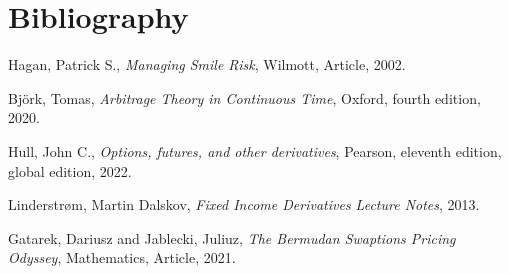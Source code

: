 \clearpage
{}
\section*{Bibliography}
\renewcommand{\refname}{} 

\begin{thebibliography}{25}
Hagan, Patrick S., \emph{Managing Smile Risk},
Wilmott, Article, 2002.

Björk, Tomas, \emph{Arbitrage Theory in Continuous Time},
Oxford, fourth edition, 2020.

Hull, John C., \emph{Options, futures, and other derivatives},
Pearson, eleventh edition, global edition, 2022.

Linderstrøm, Martin Dalskov, \emph{Fixed Income Derivatives Lecture Notes},
2013.



Gatarek, Dariusz and Jablecki, Juliuz, \emph{The Bermudan Swaptions Pricing Odyssey},
Mathematics, Article, 2021.
\end{thebibliography}


